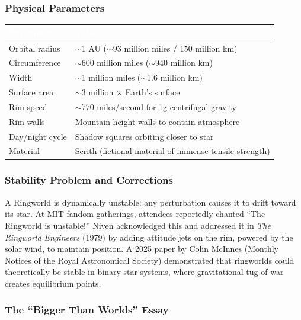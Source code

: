 \documentclass[11pt,letterpaper]{article}
\newcommand{\tableheader}[1]{\textbf{\sffamily\textcolor{white}{#1}}}
\begin{document}
\subsubsection{Physical Parameters}

\begin{center}
\begin{tabularx}{\textwidth}{L{4cm}X}
\toprule
{}
\tableheader{Parameter} & \tableheader{Value} \\
\midrule
Orbital radius & $\sim$1 AU ($\sim$93 million miles / 150 million km) \\
Circumference & $\sim$600 million miles ($\sim$940 million km) \\
Width & $\sim$1 million miles ($\sim$1.6 million km) \\
Surface area & $\sim$3 million $\times$ Earth's surface \\
Rim speed & $\sim$770 miles/second for 1g centrifugal gravity \\
Rim walls & Mountain-height walls to contain atmosphere \\
Day/night cycle & Shadow squares orbiting closer to star \\
Material & Scrith (fictional material of immense tensile strength) \\
\bottomrule
\end{tabularx}
\end{center}

\subsubsection{Stability Problem and Corrections}

A Ringworld is dynamically unstable: any perturbation causes it to drift toward its star. At MIT fandom gatherings, attendees reportedly chanted ``The Ringworld is unstable!'' Niven acknowledged this and addressed it in \textit{The Ringworld Engineers} (1979) by adding attitude jets on the rim, powered by the solar wind, to maintain position. A 2025 paper by Colin McInnes (Monthly Notices of the Royal Astronomical Society) demonstrated that ringworlds could theoretically be stable in binary star systems, where gravitational tug-of-war creates equilibrium points.

\subsubsection{The ``Bigger Than Worlds'' Essay}
\end{document}
